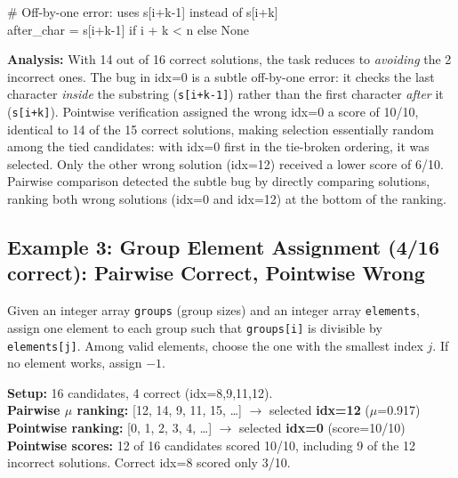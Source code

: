 \begin{tcolorbox}[
    colback=red!5,
    colframe=red!60!black,
    title={\textbf{Pointwise-Selected Solution (idx=0): Incorrect (off-by-one) \ding{55}}},
    coltitle=white,
    fonttitle=\small\bfseries,
    breakable,
    enhanced
]
\small\ttfamily
\# Off-by-one error: uses s[i+k-1] instead of s[i+k]\\
after\_char = s[i+k-1] if i + k < n else None
\end{tcolorbox}

\noindent\textbf{Analysis:} With 14 out of 16 correct solutions, the task reduces to \emph{avoiding} the 2 incorrect ones. The bug in idx=0 is a subtle off-by-one error: it checks the last character \emph{inside} the substring (\texttt{s[i+k-1]}) rather than the first character \emph{after} it (\texttt{s[i+k]}). Pointwise verification assigned the wrong idx=0 a score of 10/10, identical to 14 of the 15 correct solutions, making selection essentially random among the tied candidates: with idx=0 first in the tie-broken ordering, it was selected. Only the other wrong solution (idx=12) received a lower score of 6/10. Pairwise comparison detected the subtle bug by directly comparing solutions, ranking both wrong solutions (idx=0 and idx=12) at the bottom of the ranking.


\subsection{Example 3: Group Element Assignment (4/16 correct): Pairwise Correct, Pointwise Wrong}

\begin{tcolorbox}[
    colback=promptbg,
    colframe=promptborder,
    title={\textbf{Problem: Assign elements to groups by divisibility}},
    coltitle=white,
    fonttitle=\small\bfseries,
    breakable,
    enhanced
]
\small
Given an integer array \texttt{groups} (group sizes) and an integer array \texttt{elements}, assign one element to each group such that \texttt{groups[i]} is divisible by \texttt{elements[j]}. Among valid elements, choose the one with the smallest index $j$. If no element works, assign $-1$.
\end{tcolorbox}

\noindent\textbf{Setup:} 16 candidates, 4 correct (idx=8,9,11,12).\\
\textbf{Pairwise $\mu$ ranking:} [12, 14, 9, 11, 15, \ldots] $\rightarrow$ selected \textbf{idx=12} ($\mu$=0.917) \checkmark\\
\textbf{Pointwise ranking:} [0, 1, 2, 3, 4, \ldots] $\rightarrow$ selected \textbf{idx=0} (score=10/10) \\
\textbf{Pointwise scores:} 12 of 16 candidates scored 10/10, including 9 of the 12 incorrect solutions. Correct idx=8 scored only 3/10.

